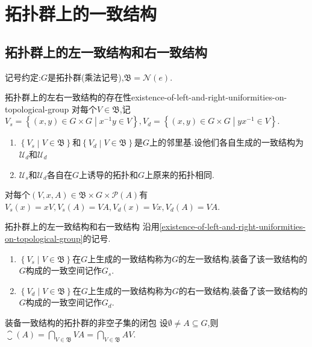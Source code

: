 \chapter{拓扑群上的一致结构}

\section{拓扑群上的左一致结构和右一致结构}

记号约定:$G$是拓扑群(乘法记号),$\mathfrak{B}=\mathcal{N}\left(e\right)$.

\begin{lemma}{拓扑群上的左右一致结构的存在性}{existence-of-left-and-right-uniformities-on-topological-group}
	对每个$V\in\mathfrak{B}$,记$V_{s}=\left\{\left(x,y\right)\in G\times G\middle|x^{-1}y\in V\right\},V_{d}=\left\{\left(x,y\right)\in G\times G\middle|yx^{-1}\in V\right\}$.
	\begin{enumerate}
		\item $\left\{V_{s}\middle|V\in\mathfrak{B}\right\}$和$\left\{V_{d}\middle|V\in\mathfrak{B}\right\}$是$G$上的邻里基.设他们各自生成的一致结构为$\mathcal{U}_{d}$和$\mathcal{U}_{d}$
		\item $\mathcal{U}_{s}$和$\mathcal{U}_{d}$各自在$G$上诱导的拓扑和$G$上原来的拓扑相同.
	\end{enumerate}
\end{lemma}

\begin{remark}{}{}
	对每个$\left(V,x,A\right)\in\mathfrak{B}\times G\times\mathcal{P}\left(A\right)$有$V_{s}\left(x\right)=xV,V_{s}\left(A\right)=VA,V_{d}\left(x\right)=Vx,V_{d}\left(A\right)=VA$.
\end{remark}

\begin{definition}{拓扑群上的左一致结构和右一致结构}{}
	沿用\cref{existence-of-left-and-right-uniformities-on-topological-group}的记号.
	\begin{enumerate}
		\item $\left\{V_{s}\middle|V\in\mathfrak{B}\right\}$在$G$上生成的一致结构称为$G$的左一致结构,装备了该一致结构的$G$构成的一致空间记作$G_{s}$.
		\item $\left\{V_{d}\middle|V\in\mathfrak{B}\right\}$在$G$上生成的一致结构称为$G$的右一致结构,装备了该一致结构的$G$构成的一致空间记作$G_{d}$.
	\end{enumerate}
\end{definition}

\begin{corollary}{装备一致结构的拓扑群的非空子集的闭包}{}
	设$\emptyset\neq A\subseteq G$,则$\closure\left(A\right)=\bigcap\limits_{V\in\mathfrak{B}}VA=\bigcap\limits_{V\in\mathfrak{B}}AV$.
\end{corollary}

